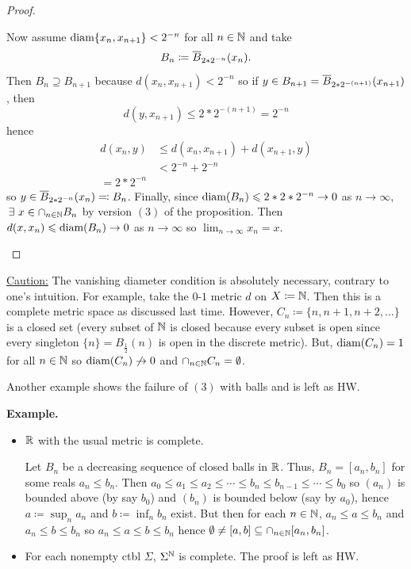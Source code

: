 \documentclass[14pt,oneside]{extarticle}
\newenvironment{example}{
    \par
    \vspace{5pt}
    \noindent\textbf{Example.}
    \begin{tcolorbox}[
        blanker, breakable, left=5mm, parbox=false,
        before upper={\parindent15pt},
        after skip=10pt,
        borderline west={1mm}{0pt}{solarized-magenta!50}]
}{
    \end{tcolorbox}
    \vspace{5pt}
}
\begin{document}
\begin{proof}
\begin{itemize}[label=]
  Now assume $\text{diam}{\{x_n, x_{n+1}\}} < 2^{-n}$ for all $n \in \mathbb{N}$ and take 
  \[B_n \coloneqq \overline{B}_{2*2^{-n}}(x_n).\]
  Then $B_n \supseteq B_{n+1}$ because $d(x_n, x_{n+1}) < 2^{-n}$ so if $y \in B_{n+1} = \overline{B}_{2*2^{-(n+1)}}(x_{n+1})$, then 
  \[d(y, x_{n+1}) \leq 2*2^{-(n+1)} = 2^{-n}\]
  hence
  \begin{align*}
    d(x_n, y) & \leq d(x_n,x_{n+1}) + d(x_{n+1}, y) \\
              & < 2^{-n} + 2^{-n} \\
              = 2*2^{-n}
  \end{align*}
  so $y \in \overline{B}_{2*2^{-n}}(x_n) \eqqcolon B_n$. Finally, since $\text{diam}{(B_n)} \leqslant 2*2*2^{-n} \to 0$ as $n \to \infty$, $\exists \, x \in \cap_{n \in \N}B_n$ by version $(3)$ of the proposition. Then $d(x,x_n) \leqslant \text{diam}{(B_n)} \to 0$ as $n \to \infty$ so $\lim_{n \to \infty} x_n = x$.
\end{itemize}
\end{proof}
\underline{Caution:} The vanishing diameter condition is absolutely necessary, contrary to one's intuition. For example, take the $0$-$1$ metric $d$ on $X \coloneqq \mathbb{N}$. Then this is a complete metric space as discussed last time. However, $C_n \coloneqq \{n, n+1, n+2, \dots\}$ is a closed set (every subset of $\mathbb{N}$ is closed because every subset is open since every singleton $\{n\} = B_\frac{1}{2}(n)$ is open in the discrete metric). But, $\text{diam}{(C_n)} = 1$ for all $n \in \mathbb{N}$ so $\text{diam}{(C_n)} \not\to 0$ and $\cap_{n \in \mathbb{N}} C_n = \emptyset$.

Another example shows the failure of $(3)$ with balls and is left as HW.

\begin{example}
  \begin{itemize}[label=$\circ$, leftmargin=*, itemsep=1em]
    \item $\mathbb{R}$ with the usual metric is complete. 
    
    \soln{} Let $B_n$ be a decreasing sequence of closed balls in $\mathbb{R}$. Thus, $B_n = [a_n, b_n]$ for some reals $a_n \leq b_n$.
    \pic    
    Then $a_0 \leq a_1 \leq a_2 \leq \cdots \leq b_n \leq b_{n-1} \leq \cdots \leq b_0$ so $(a_n)$ is bounded above (by say $b_0$) and $(b_n)$ is bounded below (say by $a_0$), hence $a \coloneqq \sup_n a_n$ and $b \coloneqq \inf_n b_n$ exist. But then for each $n \in \mathbb{N}$, $a_n \leq a \leq b_n$ and $a_n \leq b \leq b_n$ so $a_n \leq a \leq b \leq b_n$ hence $\emptyset \neq [a,b] \subseteq \cap_{n \in \mathbb{N}}[a_n, b_n]$.

    \item For each nonempty ctbl $\Sigma$, $\Sigma^{\mathbb{N}}$ is complete. The proof is left as HW.
  \end{itemize}
\end{example}
\end{document}
